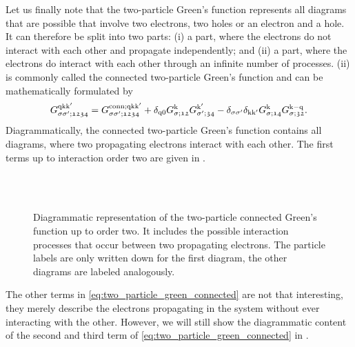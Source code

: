 \documentclass[../../main.tex]{subfiles}
\begin{document}
Let us finally note that the two-particle Green's function represents all diagrams that are possible that involve two electrons, two holes or an electron and a hole. It can therefore be split into two parts: (i) a part, where the electrons do not interact with each other and propagate independently; and (ii) a part, where the electrons do interact with each other through an infinite number of processes. (ii) is commonly called the connected two-particle Green's function and can be mathematically formulated by
\begin{align}\label{eq:two_particle_green_connected}
	G_{\sigma\sigma';\mathfrak{1234}}^{\text{q}\text{k}\text{k}'}=G_{\sigma\sigma';\mathfrak{1234}}^{\text{conn};\text{q}\text{k}\text{k}'}+\delta_{\text{q}0}G_{\sigma;\mathfrak{12}}^{\text{k}}G_{\sigma';\mathfrak{34}}^{\text{k}'}-\delta_{\sigma\sigma'}\delta_{\text{k}\text{k}'}G_{\sigma;\mathfrak{14}}^{\text{k}}G_{\sigma;\mathfrak{32}}^{\text{k}-\text{q}}.
\end{align}
Diagrammatically, the connected two-particle Green's function contains all diagrams, where two propagating electrons interact with each other. The first terms up to interaction order two are given in .
\begin{figure}[h]
  \centering
  \subfloat{}\vspace{0.5cm}\\
  \subfloat{}\vspace{0.5cm}\\
  \subfloat{}
  \caption{Diagrammatic representation of the two-particle connected Green's function up to order two. It includes the possible interaction processes that occur between two propagating electrons. The particle labels are only written down for the first diagram, the other diagrams are labeled analogously.}
  \label{fig:two_particle_green_connected}
\end{figure}
The other terms in \eqref{eq:two_particle_green_connected} are not that interesting, they merely describe the electrons propagating in the system without ever interacting with the other. However, we will still show the diagrammatic content of the second and third term of \eqref{eq:two_particle_green_connected} in .
\end{document}
